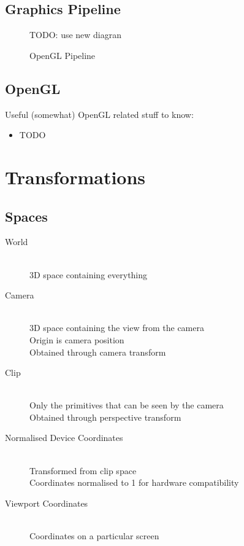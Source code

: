 \documentclass[a4paper]{article}
\begin{document}
\subsection{Graphics Pipeline}

\begin{figure}[h!]
  \centering
  TODO: use new diagran
  \caption{OpenGL Pipeline}
  \label{fig:graphics_pipeline}
\end{figure}
\FloatBarrier

\subsection{OpenGL}

Useful (somewhat) OpenGL related stuff to know:

\begin{itemize}
  \item TODO
\end{itemize}

\section{Transformations}
\label{sec:transformations}

\subsection{Spaces}

\begin{description}
  \item[World] \hfill \\
    3D space containing everything

  \item[Camera] \hfill \\
    3D space containing the view from the camera \\
    Origin is camera position \\
    Obtained through camera transform

  \item[Clip] \hfill \\
    Only the primitives that can be seen by the camera \\
    Obtained through perspective transform

  \item[Normalised Device Coordinates] \hfill \\
    Transformed from clip space \\
    Coordinates normalised to 1 for hardware compatibility

  \item[Viewport Coordinates] \hfill \\
    Coordinates on a particular screen

\end{description}
\end{document}
